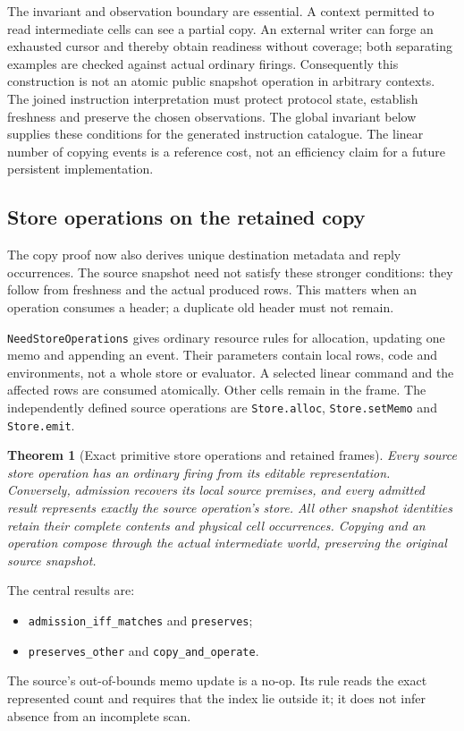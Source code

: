\documentclass[11pt]{article}
\newtheorem{theorem}{Theorem}
\newcommand{\code}[1]{\texttt{\small #1}}
\begin{document}
The invariant and observation boundary are essential. A context permitted
to read intermediate cells can see a partial copy. An external writer can
forge an exhausted cursor and thereby obtain readiness without coverage;
both separating examples are checked against actual ordinary firings.
Consequently this construction is not an atomic public snapshot operation
in arbitrary contexts. The joined instruction interpretation must protect
protocol state, establish freshness and preserve the chosen observations.
The global invariant below supplies these conditions for the generated
instruction catalogue. The linear number of copying events is a reference
cost, not an efficiency claim for a future persistent implementation.

\subsection{Store operations on the retained copy}

The copy proof now also derives unique destination metadata and reply
occurrences. The source snapshot need not satisfy these stronger conditions:
they follow from freshness and the actual produced rows. This matters when
an operation consumes a header; a duplicate old header must not remain.

\code{NeedStoreOperations} gives ordinary resource rules for allocation,
updating one memo and appending an event. Their parameters contain local
rows, code and environments, not a whole store or evaluator. A selected
linear command and the affected rows are consumed atomically. Other cells
remain in the frame. The independently defined source operations are
\code{Store.alloc}, \code{Store.setMemo} and \code{Store.emit}.

\begin{theorem}[Exact primitive store operations and retained frames]
Every source store operation has an ordinary firing from its editable
representation. Conversely, admission recovers its local source premises,
and every admitted result represents exactly the source operation's store.
All other snapshot identities retain their complete contents and physical
cell occurrences. Copying and an operation compose through the actual
intermediate world, preserving the original source snapshot.
\end{theorem}
The central results are:
\begin{itemize}
\item \code{admission\_iff\_matches} and \code{preserves};
\item \code{preserves\_other} and \code{copy\_and\_operate}.
\end{itemize}
The source's out-of-bounds memo update is a no-op. Its rule reads the exact
represented count and requires that the index lie outside it; it does not
infer absence from an incomplete scan.
\end{document}
